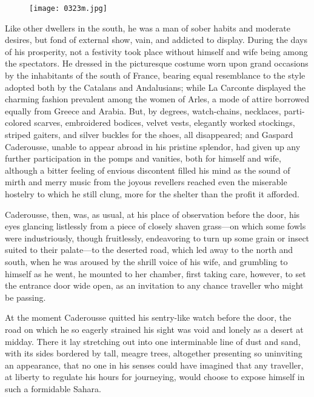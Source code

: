 \begin{figure}[h]
\texttt{[image: 0323m.jpg]}
\end{figure}

Like other dwellers in the south, he was a man of sober habits and
moderate desires, but fond of external show, vain, and addicted to
display. During the days of his prosperity, not a festivity took place
without himself and wife being among the spectators. He dressed in the
picturesque costume worn upon grand occasions by the inhabitants of the
south of France, bearing equal resemblance to the style adopted both by
the Catalans and Andalusians; while La Carconte displayed the charming
fashion prevalent among the women of Arles, a mode of attire borrowed
equally from Greece and Arabia. But, by degrees, watch-chains,
necklaces, parti-colored scarves, embroidered bodices, velvet vests,
elegantly worked stockings, striped gaiters, and silver buckles for the
shoes, all disappeared; and Gaspard Caderousse, unable to appear abroad
in his pristine splendor, had given up any further participation in the
pomps and vanities, both for himself and wife, although a bitter
feeling of envious discontent filled his mind as the sound of mirth and
merry music from the joyous revellers reached even the miserable
hostelry to which he still clung, more for the shelter than the profit
it afforded.

Caderousse, then, was, as usual, at his place of observation before the
door, his eyes glancing listlessly from a piece of closely shaven
grass—on which some fowls were industriously, though fruitlessly,
endeavoring to turn up some grain or insect suited to their palate—to
the deserted road, which led away to the north and south, when he was
aroused by the shrill voice of his wife, and grumbling to himself as he
went, he mounted to her chamber, first taking care, however, to set the
entrance door wide open, as an invitation to any chance traveller who
might be passing.

At the moment Caderousse quitted his sentry-like watch before the door,
the road on which he so eagerly strained his sight was void and lonely
as a desert at midday. There it lay stretching out into one
interminable line of dust and sand, with its sides bordered by tall,
meagre trees, altogether presenting so uninviting an appearance, that
no one in his senses could have imagined that any traveller, at liberty
to regulate his hours for journeying, would choose to expose himself in
such a formidable Sahara.

